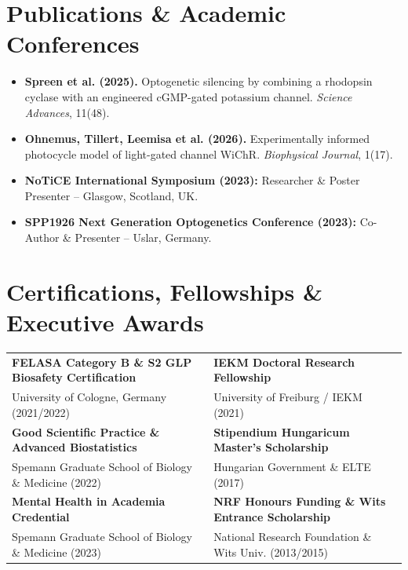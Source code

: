 \documentclass[10pt,a4paper]{article}
\begin{document}
\section{Publications \& Academic Conferences}
\begin{itemize}
    \item \textbf{Spreen et al. (2025).} Optogenetic silencing by combining a rhodopsin cyclase with an engineered cGMP-gated potassium channel. \textit{Science Advances}, 11(48).
    \item \textbf{Ohnemus, Tillert, Leemisa et al. (2026).} Experimentally informed photocycle model of light-gated channel WiChR. \textit{Biophysical Journal}, 1(17).
    \item \textbf{NoTiCE International Symposium (2023):} Researcher \& Poster Presenter -- Glasgow, Scotland, UK.
    \item \textbf{SPP1926 Next Generation Optogenetics Conference (2023):} Co-Author \& Presenter -- Uslar, Germany.
\end{itemize}

\section{Certifications, Fellowships \& Executive Awards}
\begin{tcolorbox}[colback=bglight, colframe=bordergray, arc=3pt, boxrule=0.5pt, top=4pt, bottom=4pt, left=6pt, right=6pt]
\begin{tabularx}{\textwidth}{@{}X X@{}}
\textbf{FELASA Category B \& S2 GLP Biosafety Certification} & \textbf{IEKM Doctoral Research Fellowship} \\
\small\color{textgray} University of Cologne, Germany (2021/2022) & \small\color{textgray} University of Freiburg / IEKM (2021) \\[3pt]
\textbf{Good Scientific Practice \& Advanced Biostatistics} & \textbf{Stipendium Hungaricum Master's Scholarship} \\
\small\color{textgray} Spemann Graduate School of Biology \& Medicine (2022) & \small\color{textgray} Hungarian Government \& ELTE (2017) \\[3pt]
\textbf{Mental Health in Academia Credential} & \textbf{NRF Honours Funding \& Wits Entrance Scholarship} \\
\small\color{textgray} Spemann Graduate School of Biology \& Medicine (2023) & \small\color{textgray} National Research Foundation \& Wits Univ. (2013/2015)
\end{tabularx}
\end{tcolorbox}
\end{document}
